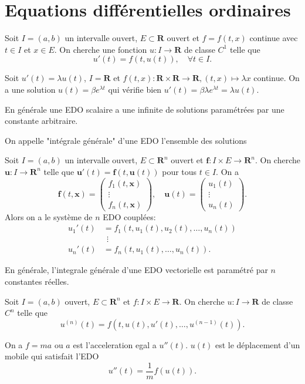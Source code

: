 \chapter{Equations différentielles ordinaires}
Soit $I=(a,b)$ un intervalle ouvert, $E\subset \mathbf{R}$ ouvert et $f=f(t,x)$ continue avec $t\in I$ et $x \in E$. On cherche une fonction $u:I\to \mathbf{R}$ de classe $C^{1}$ telle que 
$$
u'(t)=f(t,u(t)),\quad \forall t\in I.
$$
\begin{example}
Soit $u'(t)=\lambda u(t)$, $I=\mathbf{R}$ et $f(t,x):\mathbf{R}\times \mathbf{R}\to \mathbf{R},(t,x)\mapsto\lambda x$ continue. On a une solution $u(t)=\beta e^{\lambda t}$ qui vérifie bien $u'(t)=\beta\lambda e^{ \lambda t }=\lambda u(t)$.
\end{example}
\begin{remark}
En générale une EDO scalaire a une infinite de solutions paramétrées par une constante arbitraire.
\end{remark}
\begin{definition}
On appelle "intégrale générale" d'une EDO l'ensemble des solutions
\end{definition}
\begin{definition}
Soit $I=(a,b)$ un intervalle ouvert, $E\subset \mathbf{R}^{n}$ ouvert et $\boldsymbol{f}:I\times E\to \mathbf{R}^{n}$. On cherche $\boldsymbol{u}:I\to \mathbf{R}^{n}$ telle que $\boldsymbol{u}'(t)=\boldsymbol{f}(t,\boldsymbol{u}(t))$ pour tous  $t\in I$. On a
$$
\boldsymbol{f}(t,\boldsymbol{x})=\begin{pmatrix}
f_{1}(t,\boldsymbol{x}) \\
 \vdots \\
f_{n}(t,\boldsymbol{x})
\end{pmatrix},\quad \boldsymbol{u}(t)=\begin{pmatrix}
u_{1}(t) \\
\vdots \\
u_{n}(t)
\end{pmatrix}.
$$
Alors on a le système de $n$ EDO couplées:
\begin{align*}
u_{1}'(t) & =f_{1}(t,u_{1}(t),u_{2}(t),\dots,u_{n}(t)) \\
 & ~~\vdots \\
u_{n}'(t) & =f_{n}(t,u_{1}(t),\dots,u_{n}(t)).
\end{align*}
\end{definition}
\begin{remark}
En générale, l'integrale générale d'une EDO vectorielle est paramétré par $n$ constantes réelles.
\end{remark}
\begin{definition}
Soit $I=(a,b)$ ouvert, $E\subset \mathbf{R}^{n}$ et $f:I\times E\to \mathbf{R}$. On cherche $u:I\to \mathbf{R}$ de classe $C^{n}$ telle que
$$
u^{(n)}(t)=f(t,u(t),u'(t),\dots,u^{(n-1)}(t)).
$$
\end{definition}
\begin{example}
On a $f=ma$ ou $a$ est l'acceleration egal a $u''(t)$. $u(t)$ est le déplacement d'un mobile qui satisfait l'EDO 
$$
u''(t)=\frac{1}{m}f(u(t)).
$$
\end{example}

